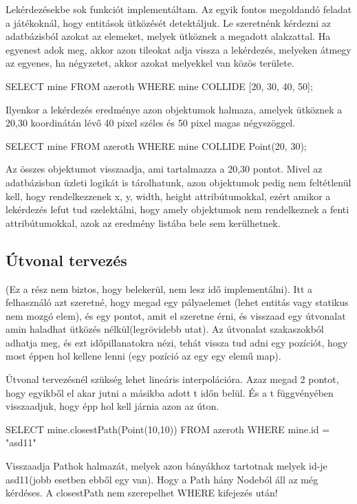 \begin{sql}
Lekérdezésekbe sok funkciót implementáltam. Az egyik fontos megoldandó feladat a játékoknál, hogy entitások ütközését detektáljuk. 
Le szeretnénk kérdezni az adatbázisból azokat az elemeket, melyek ütköznek a megadott alakzattal. Ha egyenest adok meg, akkor azon tileokat adja vissza a lekérdezés, melyeken átmegy az egyenes, ha négyzetet, akkor azokat melyekkel van közös területe.

\begin{sql}
SELECT mine
FROM azeroth
WHERE mine COLLIDE [20, 30, 40, 50];
\end{sql}

Ilyenkor a lekérdezés eredménye azon objektumok halmaza, amelyek ütköznek a 20,30 koordinátán lévő 40 pixel széles és 50 pixel magas négyszöggel.

\begin{sql}
SELECT mine
FROM azeroth
WHERE mine COLLIDE Point(20, 30);
\end{sql}

Az összes objektumot visszaadja, ami tartalmazza a 20,30 pontot. 
Mivel az adatbázisban üzleti logikát is tárolhatunk, azon objektumok pedig nem feltétlenül kell, hogy rendelkezzenek x, y, width, height attribútumokkal, ezért amikor a lekérdezés lefut tud szelektálni, hogy amely objektumok nem rendelkeznek a fenti attribútumokkal, azok az eredmény listába bele sem kerülhetnek.


\subsection{Útvonal tervezés}

(Ez a rész nem biztos, hogy belekerül, nem lesz idő implementálni). Itt a felhasználó azt szeretné, hogy megad egy pályaelemet (lehet entitás vagy statikus nem mozgó elem), és egy pontot, amit el szeretne érni, és visszaad egy útvonalat amin haladhat ütközés nélkül(legrövidebb utat). Az útvonalat szakaszokból adhatja meg, és ezt időpillanatokra nézi, tehát vissza tud adni egy pozíciót, hogy most éppen hol kellene lenni (egy pozíció az egy egy elemű map).

Útvonal tervezésnél szükség lehet lineáris interpolációra. Azaz megad 2 pontot, hogy egyikből el akar jutni a másikba adott t időn belül. És a t függvényében visszaadjuk, hogy épp hol kell járnia azon az úton.

\begin{sql}
SELECT mine.closestPath(Point(10,10)) FROM azeroth WHERE mine.id = "asd11"
\end{sql}
Visszaadja Pathok halmazát, melyek azon bányákhoz tartotnak melyek id-je asd11(jobb esetben ebből egy van). Hogy a Path hány Nodeból áll az még kérdéses.
A closestPath nem szerepelhet WHERE kifejezés után!



\end{sql}
